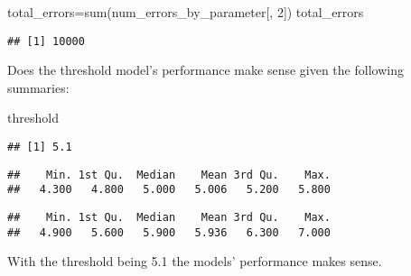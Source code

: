 \documentclass[
]{article}
\newenvironment{Shaded}{\begin{snugshade}}{\end{snugshade}}
\newcommand{\DecValTok}[1]{\textcolor[rgb]{0.00,0.00,0.81}{#1}}
\newcommand{\FunctionTok}[1]{\textcolor[rgb]{0.00,0.00,0.00}{#1}}
\newcommand{\NormalTok}[1]{#1}
\newcommand{\OtherTok}[1]{\textcolor[rgb]{0.56,0.35,0.01}{#1}}
\newcommand{\SpecialCharTok}[1]{\textcolor[rgb]{0.00,0.00,0.00}{#1}}
\newcommand{\StringTok}[1]{\textcolor[rgb]{0.31,0.60,0.02}{#1}}
\begin{document}
\begin{Shaded}
\begin{Highlighting}[]
\NormalTok{total\_errors}\OtherTok{=}\FunctionTok{sum}\NormalTok{(num\_errors\_by\_parameter[, }\DecValTok{2}\NormalTok{])}
\NormalTok{total\_errors}
\end{Highlighting}
\end{Shaded}

\begin{verbatim}
## [1] 10000
\end{verbatim}

Does the threshold model's performance make sense given the following
summaries:

\begin{Shaded}
\begin{Highlighting}[]
\NormalTok{threshold}
\end{Highlighting}
\end{Shaded}

\begin{verbatim}
## [1] 5.1
\end{verbatim}

\begin{Shaded}
\end{Shaded}

\begin{verbatim}
##    Min. 1st Qu.  Median    Mean 3rd Qu.    Max. 
##   4.300   4.800   5.000   5.006   5.200   5.800
\end{verbatim}

\begin{Shaded}
\end{Shaded}

\begin{verbatim}
##    Min. 1st Qu.  Median    Mean 3rd Qu.    Max. 
##   4.900   5.600   5.900   5.936   6.300   7.000
\end{verbatim}

With the threshold being 5.1 the models' performance makes sense.
\end{document}
